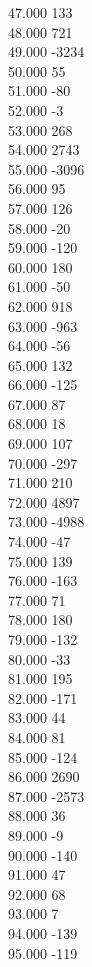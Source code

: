 { 47.000	133 \\
 48.000	721 \\
 49.000	-3234 \\
 50.000	55 \\
 51.000	-80 \\
 52.000	-3 \\
 53.000	268 \\
 54.000	2743 \\
 55.000	-3096 \\
 56.000	95 \\
 57.000	126 \\
 58.000	-20 \\
 59.000	-120 \\
 60.000	180 \\
 61.000	-50 \\
 62.000	918 \\
 63.000	-963 \\
 64.000	-56 \\
 65.000	132 \\
 66.000	-125 \\
 67.000	87 \\
 68.000	18 \\
 69.000	107 \\
 70.000	-297 \\
 71.000	210 \\
 72.000	4897 \\
 73.000	-4988 \\
 74.000	-47 \\
 75.000	139 \\
 76.000	-163 \\
 77.000	71 \\
 78.000	180 \\
 79.000	-132 \\
 80.000	-33 \\
 81.000	195 \\
 82.000	-171 \\
 83.000	44 \\
 84.000	81 \\
 85.000	-124 \\
 86.000	2690 \\
 87.000	-2573 \\
 88.000	36 \\
 89.000	-9 \\
 90.000	-140 \\
 91.000	47 \\
 92.000	68 \\
 93.000	7 \\
 94.000	-139 \\
 95.000	-119 \\
}
